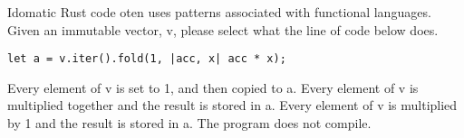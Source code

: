 %
%
Idomatic Rust code oten uses patterns associated with functional languages. Given an immutable vector, v, please select what the line of code below does.
\begin{lstlisting}
let a = v.iter().fold(1, |acc, x| acc * x);
\end{lstlisting}
  \choice Every element of v is set to 1, and then copied to a.
  \choice Every element of v is multiplied together and the result is stored in a.
  \choice Every element of v is multiplied by 1 and the result is stored in a.
  \choice The program does not compile.

